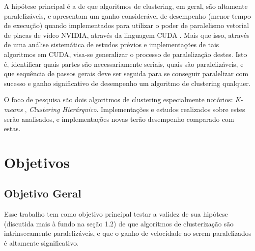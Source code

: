\documentclass[12pt, %
openright, 
oneside, %
a4paper,    %
brazil]{facom-ufu-abntex2}
\def\qntAlgrtm{dois}
\begin{document}

A hipótese principal é a de que algoritmos de clustering, em geral, são altamente paralelizáveis, e apresentam um ganho considerável de desempenho (menor tempo de execução) quando implementados para utilizar o poder de paralelismo vetorial de placas de vídeo NVIDIA, através da linguagem CUDA \cite{CUDAZone}. Mais que isso, através de uma análise sistemática de estudos prévios e implementações de tais algoritmos em CUDA, visa-se generalizar o processo de paralelização destes. Isto é, identificar quais partes são necessariamente seriais, quais são paralelizáveis, e que sequência de passos gerais deve ser seguida para se conseguir paralelizar com sucesso e ganho significativo de desempenho um algoritmo de clustering qualquer.


O foco de pesquisa são \qntAlgrtm{} algoritmos de clustering especialmente notórios: \textit{K-means} \cite{GPU-accelerated-K-Means}, \textit{Clustering Hierárquico}. Implementações e estudos realizados sobre estes serão analisados, e implementações novas terão desempenho comparado com estas.






\section{Objetivos}

\subsection{Objetivo Geral}

Esse trabalho tem como objetivo principal testar a validez de sua hipótese (discutida mais à fundo na seção 1.2) de que algoritmos de clusterização são intrinsecamente paralelizáveis, e que o ganho de velocidade ao serem paralelizados é altamente significativo.
\end{document}

